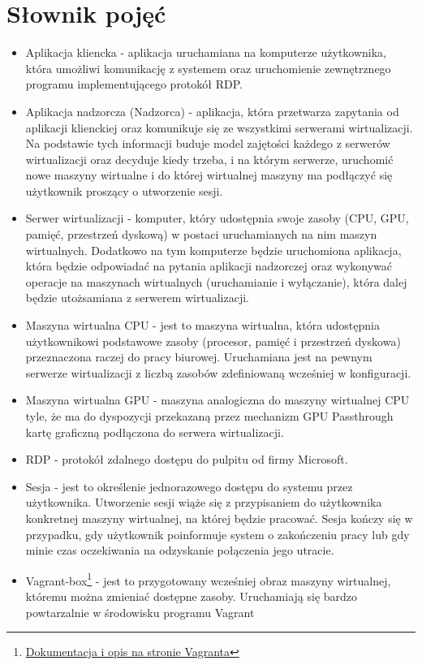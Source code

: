 \documentclass[12pt]{article}
\begin{document}
\section{Słownik pojęć}
\begin{itemize}
	\item Aplikacja kliencka - aplikacja uruchamiana na komputerze użytkownika, która umożliwi komunikację z systemem oraz uruchomienie zewnętrznego programu implementującego protokół RDP.
	\item Aplikacja nadzorcza (Nadzorca) - aplikacja, która przetwarza zapytania od aplikacji klienckiej oraz komunikuje się ze wszystkimi serwerami wirtualizacji. Na podstawie tych informacji buduje model zajętości każdego z serwerów wirtualizacji oraz decyduje kiedy trzeba, i na którym serwerze, uruchomić nowe maszyny wirtualne i do której wirtualnej maszyny ma podłączyć się użytkownik proszący o utworzenie sesji.
	\item Serwer wirtualizacji - komputer, który udostępnia swoje zasoby (CPU, GPU, pamięć, przestrzeń dyskową) w postaci uruchamianych na nim maszyn wirtualnych. Dodatkowo na tym komputerze będzie uruchomiona aplikacja, która będzie odpowiadać na pytania aplikacji nadzorczej oraz wykonywać operacje na maszynach wirtualnych (uruchamianie i wyłączanie), która dalej będzie utożsamiana z serwerem wirtualizacji.
	\item Maszyna wirtualna CPU - jest to maszyna wirtualna, która udostępnia użytkownikowi podstawowe zasoby (procesor, pamięć i przestrzeń dyskowa) przeznaczona raczej do pracy biurowej. Uruchamiana jest na pewnym serwerze wirtualizacji z liczbą zasobów zdefiniowaną wcześniej w konfiguracji.
	\item Maszyna wirtualna GPU - maszyna analogiczna do maszyny wirtualnej CPU tyle, że ma do dyspozycji przekazaną przez mechanizm GPU Passthrough kartę graficzną podłączona do serwera wirtualizacji.
	\item RDP - protokół zdalnego dostępu do pulpitu od firmy Microsoft.
	\item Sesja - jest to określenie jednorazowego dostępu do systemu przez użytkownika. Utworzenie sesji wiąże się z przypisaniem do użytkownika konkretnej maszyny wirtualnej, na której będzie pracować. Sesja kończy się w przypadku, gdy użytkownik poinformuje system o zakończeniu pracy lub gdy minie czas oczekiwania na odzyskanie połączenia jego utracie.
	\item Vagrant-box\footnote{\href{https://www.vagrantup.com/docs/boxes}{Dokumentacja i opis na stronie Vagranta}} - jest to przygotowany wcześniej obraz maszyny wirtualnej, któremu można zmieniać dostępne zasoby. Uruchamiają się bardzo powtarzalnie w środowisku programu Vagrant

\end{itemize}
\end{document}
